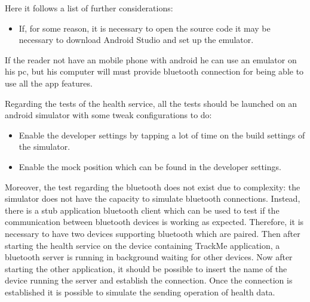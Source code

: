 \par 
Here it follows a list of further considerations: 
\begin{itemize}
\item If, for some reason, it is necessary to open the source code it may be necessary to download Android Studio and set up the emulator. \\
\end{itemize}

\par
If the reader not have an mobile phone with android he can use an emulator on his pc, but his computer will must provide bluetooth connection for being able to use all the app features.

Regarding the tests of the health service, all the tests should be launched on an android simulator with some tweak configurations to do:
\begin{itemize}
\item Enable the developer settings by tapping a lot of time on the build settings of the simulator.
\item Enable the mock position which can be found in the developer settings.
\end{itemize}
Moreover, the test regarding the bluetooth does not exist due to complexity: the simulator does not have the capacity to simulate bluetooth connections. Instead, there is a stub application bluetooth client which can be used to test if the communication between bluetooth devices is working as expected. Therefore, it is necessary to have two devices supporting bluetooth which are paired. Then after starting the health service on the device containing TrackMe application, a bluetooth server is running in background waiting for other devices. Now after starting the other application, it should be possible to insert the name of the device running the server and establish the connection. Once the connection is established it is possible to simulate the sending operation of health data.


